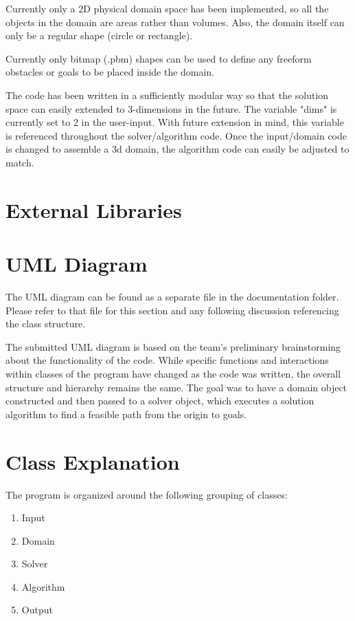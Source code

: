 \documentclass[10pt]{article}
\begin{document}
	Currently only a 2D physical domain space has been implemented, so all the objects in the domain are areas rather than volumes. Also, the domain itself can only be a regular shape (circle or rectangle).

	Currently only bitmap (.pbm) shapes can be used to define any freeform obstacles or goals to be placed inside the domain.
	
	The code has been written in a sufficiently modular way so that the solution space can easily extended to 3-dimensions in the future. The variable "dims" is currently set to 2 in the user-input. With future extension in mind, this variable is referenced throughout the solver/algorithm code. Once the input/domain code is changed to assemble a 3d domain, the algorithm code can easily be adjusted to match.

\section{External Libraries}

\newpage
\section{UML Diagram}
	The UML diagram can be found as a separate file in the documentation folder. Please refer to that file for this section and any following discussion referencing the class structure.

	The submitted UML diagram is based on the team's preliminary brainstorming about the functionality of the code. While specific functions and interactions within classes of the program have changed as the code was written, the overall structure and hierarchy remains the same. The goal was to have a domain object constructed and then passed to a solver object, which executes a solution algorithm to find a feasible path from the origin to goals.

\section{Class Explanation}

	The program is organized around the following grouping of classes:
	
	\begin{enumerate}
		\item Input
		\item Domain 
		\item Solver
		\item Algorithm
		\item Output
	\end{enumerate}	
\end{document}
